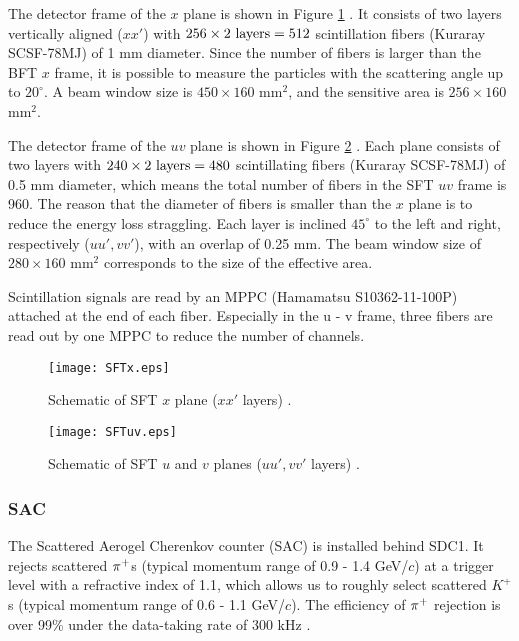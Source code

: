 The detector frame of the $x$ plane is shown in Figure \ref{fig-SFTx} \cite{Honda-D}. It consists of two layers vertically aligned ($xx'$) with $256\times2\ \rm{layers}=512$ scintillation fibers (Kuraray SCSF-78MJ) of 1 mm diameter. Since the number of fibers is larger than the BFT $x$ frame, it is possible to measure the particles with the scattering angle up to $20^{\circ}$. A beam window size is $450\times160$ mm$^2$, and the sensitive area is $256\times160$ mm$^2$. 

The detector frame of the $uv$ plane is shown in Figure \ref{fig-SFTuv} \cite{Honda-D}. Each plane consists of two layers with $240\times2\ \rm{layers}=480$ scintillating fibers (Kuraray SCSF-78MJ) of 0.5 mm diameter, which means the total number of fibers in the SFT $uv$ frame is 960. The reason that the diameter of fibers is smaller than the $x$ plane is to reduce the energy loss straggling. Each layer is inclined $45^{\circ}$ to the left and right, respectively ($uu', vv'$), with an overlap of 0.25 mm. The beam window size of $280\times160$ mm$^2$ corresponds to the size of the effective area.

Scintillation signals are read by an MPPC (Hamamatsu S10362-11-100P) attached at the end of each fiber. Especially in the u - v frame, three fibers are read out by one MPPC to reduce the number of channels. 

\begin{figure}[!h]
 \begin{center}
   \texttt{[image: SFTx.eps]}
   \caption{Schematic of SFT $x$ plane ($xx'$ layers) \cite{Honda-D}.}
   \label{fig-SFTx}
 \end{center}
\end{figure}

\begin{figure}[!h]
 \begin{center}
   \texttt{[image: SFTuv.eps]}
   \caption{Schematic of SFT $u$ and $v$ planes ($uu', vv'$ layers) \cite{Honda-D}.}
   \label{fig-SFTuv}
 \end{center}
\end{figure}


%
\subsubsection{SAC}
The Scattered Aerogel Cherenkov counter (SAC) is installed behind SDC1. It rejects scattered $\pi^{+}$s (typical momentum range of 0.9 - 1.4 GeV/$c$) at a trigger level with a refractive index of 1.1, which allows us to roughly select scattered $K^+$s (typical momentum range of 0.6 - 1.1 GeV/$c$). The efficiency of $\pi^{+}$ rejection is over 99\% under the data-taking rate of 300 kHz \cite{Koba-2016}. 

